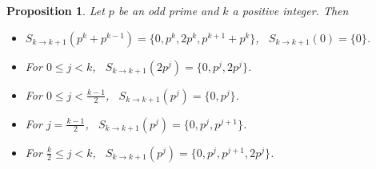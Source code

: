 \documentclass[10pt,leqno]{amsart}
\newtheorem{proposition}[theorem]{Proposition}
\theoremstyle{definition}
\theoremstyle{remark}
\numberwithin{theorem}{section}
\begin{document}
\begin{proposition}
    Let $p$ be an odd prime and $k$ a positive integer. Then \begin{itemize}
        \item $S_{k\to k+1}(p^k+p^{k-1})=\{0, p^k, 2p^k, p^{k+1}+p^k\}$, \ $S_{k\to k+1}(0)=\{0\}$.
        \item For $0\leq j<k$, \ $S_{k\to k+1}(2p^j) = \{0, p^j, 2p^j\}$.
        \item For $0\leq j<\frac{k-1}{2}$, \ $S_{k\to k+1}(p^j)=\{0, p^j\}$.
        \item For $j=\frac{k-1}{2}$, \ $S_{k \to k+1}(p^j)=\{0, p^j, p^{j+1}\}$.
        \item For $\frac{k}{2}\leq j<k$, \ $S_{k \to k+1}(p^j)=\{0, p^j, p^{j+1}, 2p^j\}$. 
    \end{itemize} 
\end{proposition}
\end{document}
